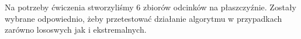 \quad Na potrzeby ćwiczenia stworzyliśmy 6 zbiorów odcinków na płaszczyźnie.
Zostały wybrane odpowiednio, żeby przetestować działanie algorytmu w przypadkach zarówno lososwych jak i ekstremalnych.